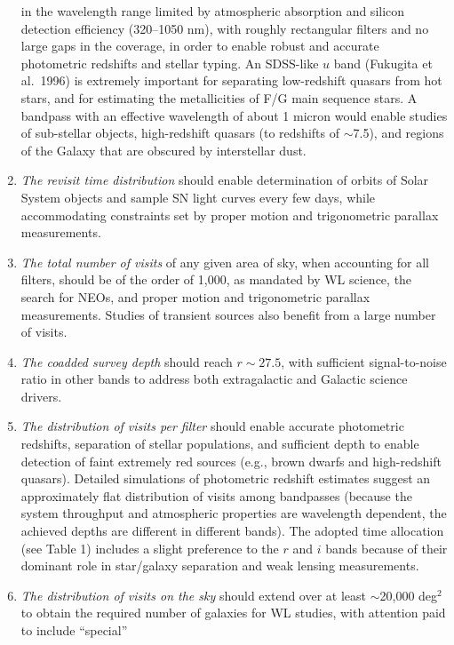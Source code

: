 \begin{enumerate}
    in the wavelength range limited by atmospheric absorption and
    silicon detection efficiency (320--1050 nm), with roughly
    rectangular filters and no large gaps in the coverage, in order
    to enable robust and accurate photometric redshifts and stellar typing. An
    SDSS-like $u$ band (Fukugita et al.~1996) is extremely important for separating
    low-redshift quasars from hot stars, and for estimating the metallicities of
    F/G main sequence stars. A bandpass with an effective wavelength of
    about 1 micron  would enable studies of sub-stellar objects, high-redshift
    quasars (to redshifts of $\sim$7.5), and regions of the Galaxy that are obscured
    by interstellar dust.
\item  {\it The revisit time distribution} should enable determination of
   orbits of Solar System objects and sample SN light curves every few days,
   while accommodating constraints set by proper motion and trigonometric
   parallax measurements.
\item  {\it The total number of visits} of any given area of sky, when accounting for all
   filters, should be of the order of 1,000, as mandated by WL
   science, the search for NEOs, and proper motion and
   trigonometric parallax measurements. Studies of transient sources
   also benefit from a large number of visits.
\item  {\it The coadded survey depth} should reach
    $r\sim27.5$, with sufficient signal-to-noise ratio in other bands
    to address both extragalactic and Galactic science drivers.
\item  {\it The distribution of visits per filter} should enable
   accurate photometric redshifts, separation of stellar populations,
   and sufficient depth to enable detection of faint extremely red
   sources (e.g., brown dwarfs and high-redshift quasars). Detailed simulations of
   photometric redshift estimates
   suggest an approximately flat distribution of visits among bandpasses
   (because the system throughput and atmospheric properties are
    wavelength dependent, the achieved depths are different in different
    bands). The adopted time allocation
   (see Table 1) includes a slight preference to the $r$ and $i$ bands because of their
   dominant role in star/galaxy separation and weak lensing measurements.
\item  {\it The distribution of visits on the sky} should extend over
   at least $\sim$20,000 deg$^2$ to obtain the required number of galaxies
   for WL studies, with attention paid to include ``special''

\end{enumerate}
